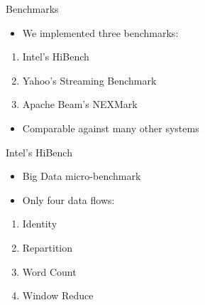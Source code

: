 \documentclass[14pt,t]{beamer}
\renewcommand{\title}[1]{
  {\huge #1} \vskip 0.4cm
}
\begin{document}
\begin{frame}
  \title{Benchmarks}
  \begin{itemize}
  \item We implemented three benchmarks:
  \end{itemize}
  \begin{enumerate}
  \item Intel's HiBench
  \item Yahoo's Streaming Benchmark
  \item Apache Beam's NEXMark
  \end{enumerate}
  \begin{itemize}
  \item Comparable against many other systems
  \end{itemize}
\end{frame}

\begin{frame}
  \title{Intel's HiBench\footnotemark}
  \begin{itemize}
  \item Big Data micro-benchmark
  \item Only four data flows:
  \end{itemize}
  \begin{enumerate}
  \item Identity \hfill{}
  \item Repartition \hfill{}
  \item Word Count \hfill{}
  \item Window Reduce \hfill{}
  \end{enumerate}
\end{frame}
\end{document}
